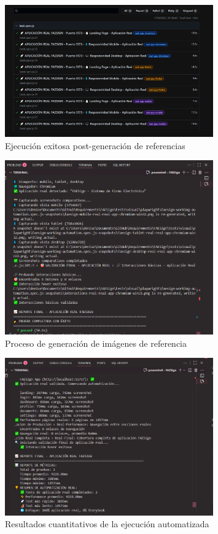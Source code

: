 \documentclass{article}
\begin{document}
\begin{figure}[H]
\centering
\includegraphics[width=0.8\textwidth]{playwright/3Automatizacion_Succesfully.png}
\caption{Ejecución exitosa post-generación de referencias}
\label{fig:playwright-success-auto}
\end{figure}

\begin{figure}[H]
\centering
\includegraphics[width=0.8\textwidth]{playwright/3Automatizacion_Ejecucion_Baseline.png}
\caption{Proceso de generación de imágenes de referencia}
\label{fig:playwright-baseline-gen}
\end{figure}

\begin{figure}[H]
\centering
\includegraphics[width=0.8\textwidth]{playwright/3Resultados_Automatizacion.png}
\caption{Resultados cuantitativos de la ejecución automatizada}
\label{fig:playwright-results}
\end{figure}
\end{document}
